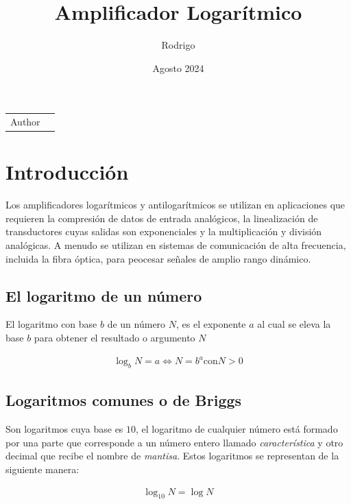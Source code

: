 \documentclass{article}
\title{Amplificador Logarítmico}
\author{Rodrigo}
\date{Agosto 2024}
\begin{document}
	
	\maketitle
	
	\noindent\begin{tabular}{@{}ll}
		Author & \theauthor\\
	\end{tabular}
	
	\section*{Introducción}
	Los amplificadores logarítmicos y antilogarítmicos se utilizan en aplicaciones que requieren la compresión de datos de entrada analógicos, la linealización de transductores cuyas salidas son exponenciales y la multiplicación y división analógicas. A menudo se utilizan en sistemas de comunicación de alta frecuencia, incluida la fibra óptica, para peocesar señales de amplio rango dinámico.
	
	\subsection*{El logaritmo de un número}
	El logaritmo con base $b$ de un número $N$, es el exponente $a$ al cual se eleva la base $b$ para obtener el resultado o argumento $N$
	
	\begin{align}
		\log_b N = a  \Leftrightarrow N = b^a \mathrm{con} N > 0		
	\end{align}
	
	\subsection*{Logaritmos comunes o de Briggs}
	Son logaritmos cuya base es $10$, el logaritmo de cualquier número está formado por una parte que corresponde a un número entero llamado \textit{característica} y otro decimal que recibe el nombre de \textit{mantisa}. Estos logaritmos se representan de la siguiente manera:
	
	\begin{align}
		\log_{10} N = \log N
	\end{align}
	
\end{document}
